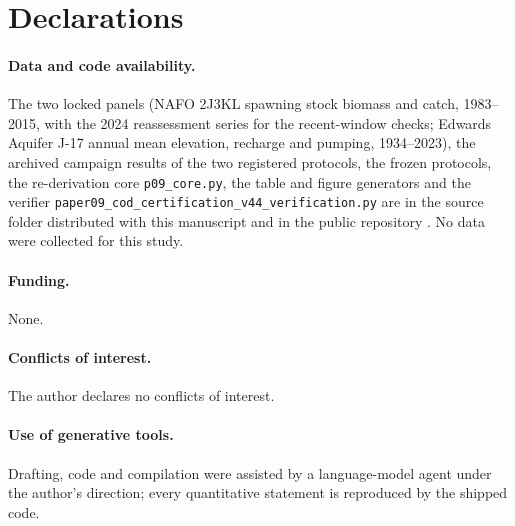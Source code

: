 \documentclass[11pt,a4paper]{article}
\theoremstyle{plain}
\theoremstyle{definition}
\theoremstyle{remark}
\begin{document}
\section*{Declarations}
\paragraph{Data and code availability.} The two locked panels (NAFO 2J3KL spawning stock biomass and catch, 1983--2015, with the 2024 reassessment series for the recent-window checks; Edwards Aquifer J-17 annual mean elevation, recharge and pumping, 1934--2023), the archived campaign results of the two registered protocols, the frozen protocols, the re-derivation core \texttt{p09\_core.py}, the table and figure generators and the verifier \texttt{paper09\_cod\_certification\_v44\_verification.py} are in the source folder  distributed with this manuscript and in the public repository . No data were collected for this study.
\paragraph{Funding.} None.
\paragraph{Conflicts of interest.} The author declares no conflicts of interest.
\paragraph{Use of generative tools.} Drafting, code and compilation were assisted by a language-model agent under the author's direction; every quantitative statement is reproduced by the shipped code.
\end{document}
